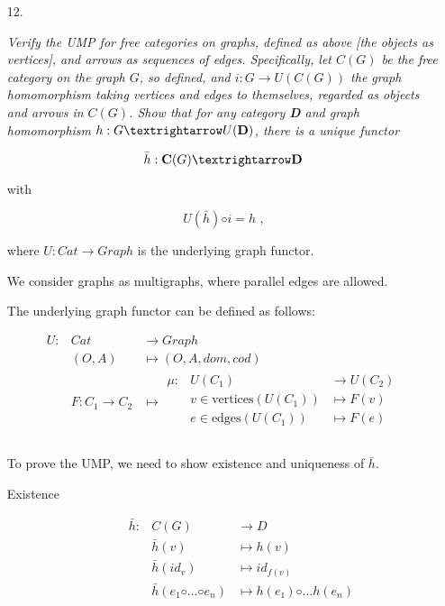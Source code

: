 \documentclass[notitlepage,a4paper]{article}
\begin{document}
\begin{enumerate}
  \item[12.]

{\em
Verify the UMP for free categories on graphs, defined as above [the objects as
vertices], and arrows as sequences of edges. Specifically, let $C(G)$ be the free category on the
graph $G$, so defined, and $i : G → U (C(G))$ the graph homomorphism taking
vertices and edges to themselves, regarded as objects and arrows in $C(G)$.
Show that for any category {\bf D} and graph homomorphism $h : G → U (\text{\bf D})$,
there is a unique functor

$$\bar{h} : \text{\bf C}(G) → \text{\bf D}$$

with

 $$U(\bar{h}) ◦ i = h\text{ ,}$$
 
where $U : Cat → Graph$ is the underlying graph functor.

}

    We consider graphs as multigraphs, where parallel edges are allowed.

    The underlying graph functor can be defined as follows:

    \begin{equation*}
    \begin{array}{rll}
    U : & Cat         & → Graph            \\
        & (O, A)      & \mapsto (O, A, dom, cod) \\
        & F : C_1 → C_2 & \mapsto
            \begin{array}{rll}
              μ : & U(C_1)       & → U(C_2)                 \\
                  & v ∈ \text{vertices}(U(C_1))     & \mapsto F(v)                  \\
                  & e ∈ \text{edges}(U(C_1))       & \mapsto F(e) \\ 
            \end{array}
            \\
    \end{array}
    \end{equation*}

    To prove the UMP, we need to show existence and uniqueness of $\bar{h}$.
    
    \begin{description}
      \item[Existence]

        \begin{equation*}
          \begin{array}{rll}
            \bar{h} : & C(G)    & → D                                     \\
                      & \bar{h}(v)                & \mapsto  h(v)               \\                
                      & \bar{h}(id_v)             & \mapsto  id_{f(v)}            \\                
                      & \bar{h}(e_1 ◦ … ◦ e_n)    & \mapsto  h(e₁) ◦ … h(e_n)    \\                
          \end{array}
        \end{equation*}


\end{description}
\end{enumerate}
\end{document}
